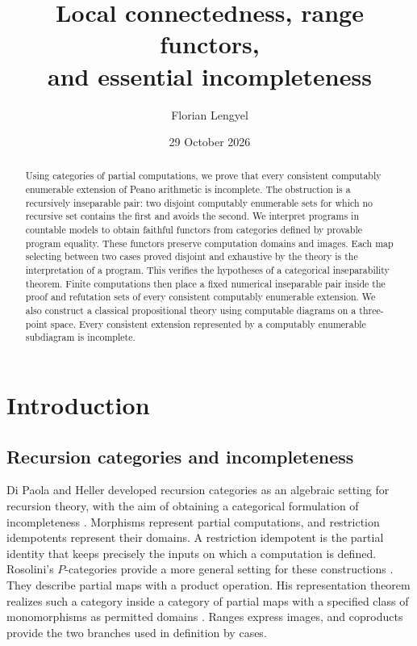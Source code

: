 \documentclass[11pt]{article}
\title{Local connectedness, range functors,\\
and essential incompleteness}
\author{Florian Lengyel}
\date{29 October 2026}
\begin{document}
\maketitle

\begin{abstract}
Using categories of partial computations, we prove that every consistent
computably enumerable extension of Peano arithmetic is incomplete.
The obstruction is a recursively inseparable pair: two disjoint
computably enumerable sets for which no recursive set contains the
first and avoids the second. We interpret programs in countable
models to obtain faithful functors from categories defined by provable
program equality. These functors preserve computation domains and
images. Each map selecting between two cases proved disjoint and
exhaustive by the theory is the interpretation of a program.
This verifies the hypotheses of a categorical
inseparability theorem. Finite computations then place a fixed
numerical inseparable pair inside the proof and refutation sets
of every consistent computably enumerable extension.
We also construct a classical propositional theory using computable
diagrams on a three-point space. Every consistent extension represented
by a computably enumerable subdiagram is incomplete.
\end{abstract}

\section{Introduction}

\subsection{Recursion categories and incompleteness}

Di Paola and Heller developed recursion categories as an algebraic
setting for recursion theory, with the aim of obtaining a categorical
formulation of incompleteness \cite{DPH}. Morphisms represent partial
computations, and restriction idempotents represent their domains.
A restriction idempotent is the partial identity that keeps precisely
the inputs on which a computation is defined.
Rosolini's $P$-categories provide a more general setting for these
constructions \cite{RosoliniThesis,Rosolini}. They describe partial
maps with a product operation. His representation theorem realizes such a
category inside a category of partial maps with a specified class of
monomorphisms as permitted domains \cite[Theorem 1.2]{Rosolini}.
Ranges express images, and coproducts provide the two branches used
in definition by cases.
\end{document}

